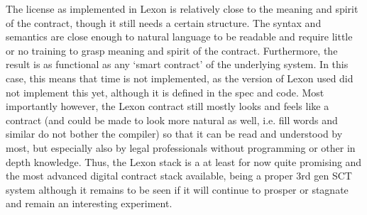 \documentclass[conference]{IEEEtran}
\begin{document}

The license as implemented in Lexon is relatively close to the meaning and spirit of the contract, though it still needs a certain structure. The syntax and semantics are close enough to natural language to be readable and require little or no training to grasp meaning and spirit of the contract. Furthermore, the result is as functional as any ‘smart contract’ of the underlying system. In this case, this means that time is not implemented, as the version of Lexon used did not implement this yet, although it is defined in the spec and code.
Most importantly however, the Lexon contract still mostly looks and feels like a contract (and could be made to look more natural as well, i.e. fill words and similar do not bother the compiler) so that it can be read and understood by most, but especially also by legal professionals without programming or other in depth knowledge.
Thus, the Lexon stack is a at least for now quite promising and the most advanced digital contract stack available, being a proper 3rd gen SCT system %
although it remains to be seen if it will continue to prosper or stagnate and remain an interesting experiment.
\end{document}
